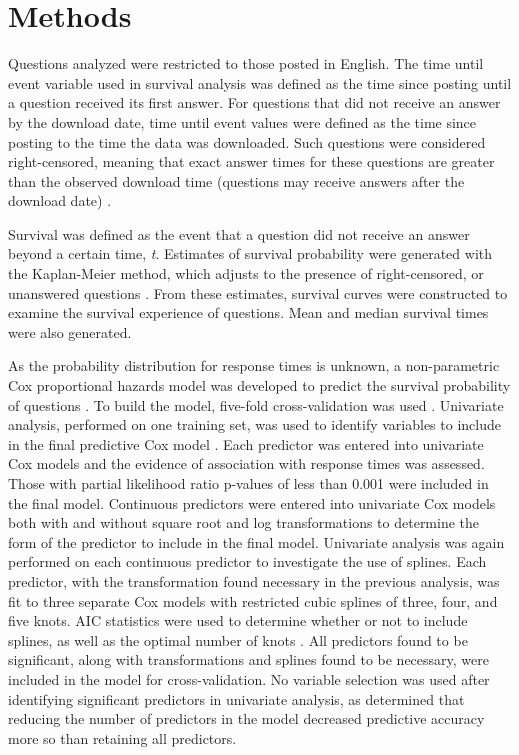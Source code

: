 \documentclass[]{interact}\usepackage[]{graphicx}\usepackage[]{color}
\begin{document}
{\section{Methods}

Questions analyzed were restricted to those posted in English. The time until event variable used in survival analysis was defined as the time since posting until a question received its first answer. For questions that did not receive an answer by the download date, time until event values were defined as the time since posting to the time the data was downloaded. Such questions were considered right-censored, meaning that exact answer times for these questions are greater than the observed download time (questions may receive answers after the download date) \citep{Kleinbaum2011}. 

Survival was defined as the event that a question did not receive an answer beyond a certain time, \textit{t}. Estimates of survival probability were generated with the Kaplan-Meier method, which adjusts to the presence of right-censored, or unanswered questions \citep{Bland1998}. From these estimates, survival curves were constructed to examine the survival experience of questions. Mean and median survival times were also generated. 

As the probability distribution for response times is unknown, a non-parametric Cox proportional hazards model was developed to predict the survival probability of questions \citep{Moore2010}. To build the model, five-fold cross-validation was used \citep{Rodriguez2010}. Univariate analysis, performed on one training set, was used to identify variables to include in the final predictive Cox model \citep{Hammermeister1979}. Each predictor was entered into univariate Cox models and the evidence of association with response times was assessed. Those with partial likelihood ratio p-values of less than 0.001 were included in the final model.  Continuous predictors were entered into univariate Cox models both with and without square root and log transformations to determine the form of the predictor to include in the final model. Univariate analysis was again performed on each continuous predictor to investigate the use of splines. Each predictor, with the transformation found necessary in the previous analysis, was fit to three separate Cox models with restricted cubic splines of three, four, and five knots. AIC statistics were used to determine whether or not to include splines, as well as the optimal number of knots \citep{Harrell2015}. All predictors found to be significant, along with transformations and splines found to be necessary, were included in the model for cross-validation. No variable selection was used after identifying significant predictors in univariate analysis, as \citet{Harrell2015} determined that reducing the number of predictors in the model decreased predictive accuracy more so than retaining all predictors. 

}
\end{document}
